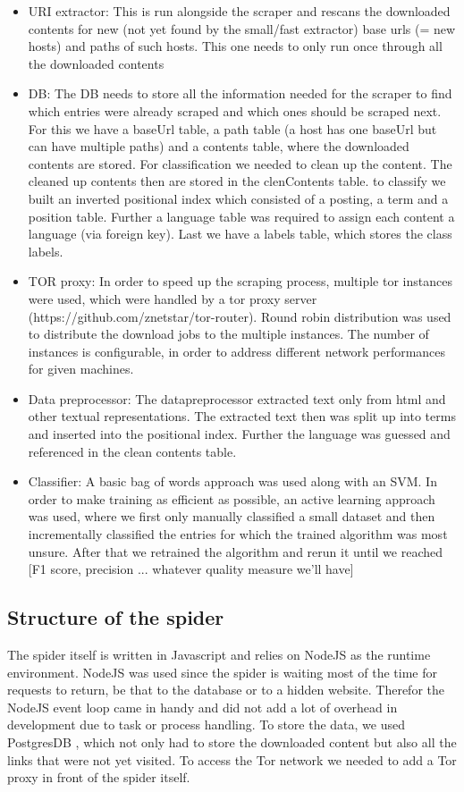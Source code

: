 \begin{itemize}
\begin{itemize}
    \end{itemize}
  \item URI extractor: This is run alongside the scraper and rescans the downloaded contents for new (not yet found by the small/fast extractor) base urls (= new hosts) and paths of such hosts. This one needs to only run once through all the downloaded contents
  \item DB: The DB needs to store all the information needed for the scraper to find which entries were already scraped and which ones should be scraped next. For this we have a baseUrl table, a path table (a host has one baseUrl but can have multiple paths) and a contents table, where the downloaded contents are stored. For classification we needed to clean up the content. The cleaned up contents then are stored in the clenContents table. to classify we built an inverted positional index which consisted of a posting, a term and a position table. Further a language table was required to assign each content a language (via foreign key). Last we have a labels table, which stores the class labels.
  \item TOR proxy: In order to speed up the scraping process, multiple tor instances were used, which were handled by a tor proxy server (https://github.com/znetstar/tor-router). Round robin distribution was used to distribute the download jobs to the multiple instances. The number of instances is configurable, in order to address different network performances for given machines.
  \item Data preprocessor: The datapreprocessor extracted text only from html and other textual representations. The extracted text then was split up into terms and inserted into the positional index. Further the language was guessed and referenced in the clean contents table.
  \item Classifier: A basic bag of words approach was used along with an SVM. In order to make training as efficient as possible, an active learning approach was used, where we first only manually classified a small dataset and then incrementally classified the entries for which the trained algorithm was most unsure. After that we retrained the algorithm and rerun it until we reached [F1 score, precision ... whatever quality measure we'll have]
\end{itemize}

\subsection{Structure of the spider}

The spider itself is written in Javascript and relies on NodeJS as the runtime environment. NodeJS was used since the spider is waiting most of the time for requests to return, be that to the database or to a hidden website. Therefor the NodeJS event loop came in handy and did not add a lot of overhead in development due to task or process handling. To store the data, we used PostgresDB , which not only had to store the downloaded content but also all the links that were not yet visited.
To access the Tor network we needed to add a Tor proxy in front of the spider itself.
